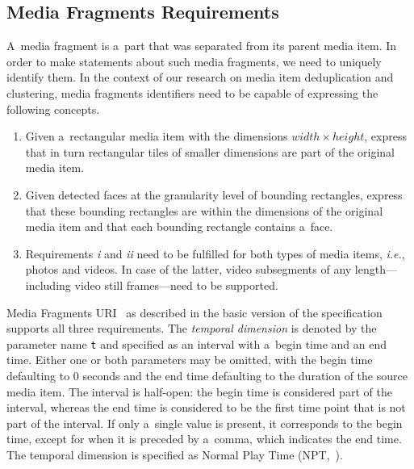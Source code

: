\subsection{Media Fragments Requirements}
\label{sec:media-fragment-requirements}

A~media fragment is a~part that was separated from its parent media item.
In order to make statements about such media fragments,
we need to uniquely identify them.
In the context of our research on media item deduplication and clustering,
media fragments identifiers need to be capable of expressing the following concepts.

\begin{enumerate}
  \itemsep0em
  \item Given a~rectangular media item with the dimensions
    $ width \times height $, express that in turn rectangular
    tiles of smaller dimensions are part of the original media item.
  \item Given detected faces at the granularity level of bounding rectangles,
    express that these bounding rectangles are within the dimensions
    of the original media item and that each bounding rectangle contains a~face.
  \item Requirements \textit{i} and \textit{ii} need to be fulfilled
    for both types of media items, \emph{i.e.}, photos and videos. In case of the latter,
    video subsegments of any length---including video still frames---need to be supported.
\end{enumerate}

Media Fragments URI~\cite{troncy2012mediafragments}
as described in the basic version of the specification
supports all three requirements.
The \emph{temporal dimension} is denoted by the parameter name \texttt{t}
and specified as an interval with a~begin time and an end time.
Either one or both parameters may be omitted,
with the begin time defaulting to 0 seconds
and the end time defaulting to the duration of the source media item.
The interval is half-open: the begin time is considered part of the interval,
whereas the end time is considered to be the first time point
that is not part of the interval.
If only a~single value is present, it corresponds to the begin time,
except for when it is preceded by a~comma,
which indicates the end time.
The temporal dimension is specified as Normal Play Time
(NPT,~\cite{schulzrinne1998realtime}).

